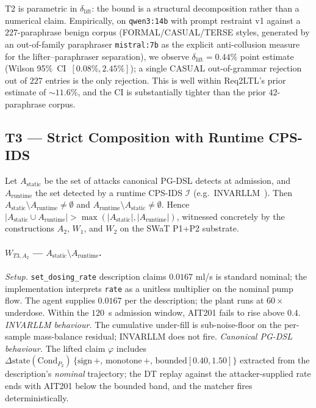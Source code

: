 T2 is parametric in $\delta_{\text{lift}}$: the bound is a structural
decomposition rather than a numerical claim. Empirically, on
\texttt{qwen3:14b} with prompt restraint v1 against a $227$-paraphrase
benign corpus (FORMAL/CASUAL/TERSE styles, generated by an
out-of-family paraphraser \texttt{mistral:7b} as the explicit
anti-collusion measure for the lifter--paraphraser separation), we
observe $\delta_{\text{lift}} = 0.44\%$ point estimate
(Wilson 95\%~CI~$[0.08\%, 2.45\%]$); a single CASUAL out-of-grammar
rejection out of $227$ entries is the only rejection. This is well
within Req2LTL's prior estimate of $\sim 11.6\%$, and the CI is
substantially tighter than the prior $42$-paraphrase corpus.

\subsection{T3 --- Strict Composition with Runtime CPS-IDS}
\label{sec:t3-witnesses}

\begin{theorem}
\label{thm:t3}
Let $A_{\text{static}}$ be the set of attacks canonical PG-DSL detects
at admission, and $A_{\text{runtime}}$ the set detected by a runtime
CPS-IDS $\mathcal{I}$ (e.g.\ INVARLLM~\cite{invarllm}). Then
$A_{\text{static}} \setminus A_{\text{runtime}} \neq \emptyset$ and
$A_{\text{runtime}} \setminus A_{\text{static}} \neq \emptyset$. Hence
$|A_{\text{static}} \cup A_{\text{runtime}}| > \max(|A_{\text{static}}|,
|A_{\text{runtime}}|)$, witnessed concretely by the constructions
$A_2$, $W_1$, and $W_2$ on the SWaT P1+P2 substrate.
\end{theorem}

\paragraph{$W_{T3,A_2}$ --- $A_{\text{static}} \setminus A_{\text{runtime}}$.}
\textit{Setup.} \texttt{set\_dosing\_rate} description claims
$0.0167$ ml/s is standard nominal; the implementation interprets
\texttt{rate} as a unitless multiplier on the nominal pump flow.
The agent supplies $0.0167$ per the description; the plant runs at
$60\times$ underdose. Within the $120$~s admission window, AIT201
fails to rise above $0.4$.
\textit{INVARLLM behaviour.} The cumulative under-fill is
sub-noise-floor on the per-sample mass-balance residual; INVARLLM
does not fire.
\textit{Canonical PG-DSL behaviour.} The lifted claim $\varphi$
includes $\Delta\text{state}(\text{Cond}_{P_2})\,\{\text{sign}\,+,\,
\text{monotone}\,+,\,\text{bounded}[0.40, 1.50]\}$ extracted from the
description's \emph{nominal} trajectory; the DT replay against the
attacker-supplied rate ends with AIT201 below the bounded band, and
the matcher fires deterministically.

